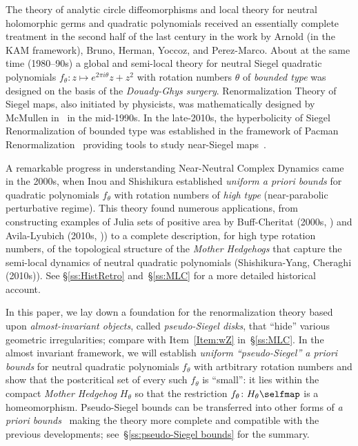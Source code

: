 \documentclass{amsart}
\newcommand{\1}{{\mathbb 1 }}
\theoremstyle{remark}
\numberwithin{equation}{section}
\theoremstyle{definition}
\begin{document}
The theory of analytic circle diffeomorphisms and local theory for neutral holomorphic germs
and quadratic polynomials received an essentially complete treatment in the
second half of the last century in the work by Arnold (in the KAM framework), Bruno,
Herman,  Yoccoz, and Perez-Marco. About at the same time (1980--90s) a global and semi-local theory for neutral Siegel quadratic polynomials $f_\theta: z\mapsto e^{2\pi i \theta} z + z^2$ with rotation numbers $\theta$  of {\em bounded type}  was designed on the basis of the  {\em Douady-Ghys surgery}. Renormalization Theory of Siegel maps, also initiated by physicists, was mathematically designed by McMullen in~\cite{McM1} in the mid-1990s. In the late-2010s, the hyperbolicity of Siegel Renormalization of bounded type was established in the framework of Pacman Renormalization~\cite{DLS} providing tools to study near-Siegel maps~\cite{DL}.


A remarkable progress in understanding Near-Neutral Complex Dynamics came in the 2000s, when Inou and Shishikura established  {\em uniform a priori bounds}
for quadratic polynomials $f_\theta$ with rotation numbers of {\em high type} (near-parabolic perturbative regime).  This theory found numerous applications, from constructing examples of Julia sets of positive area by Buff-Cheritat (2000s, \cite{BC}) and Avila-Lyubich (2010s, \cite{AL-posmeas})) to a complete
description, for high type rotation numbers,
of the topological structure of the  {\em Mother Hedgehogs} 
that capture the semi-local dynamics of  neutral quadratic polynomials
(Shishikura-Yang,  Cheraghi (2010s)). See \S\ref{ss:HistRetro} and~\S\ref{ss:MLC} for a more detailed historical account.



In this paper, we lay down a foundation for the renormalization  theory based upon \emph{almost-invariant objects}, called \emph{pseudo-Siegel disks}, that ``hide'' various geometric irregularities; compare with Item~\ref{Item:wZ} in~\S\ref{ss:MLC}. In the almost invariant framework, we will establish {\em uniform ``pseudo-Siegel'' a priori bounds} for neutral quadratic polynomials $f_\theta$ with artbitrary rotation numbers and show that the postcritical set of every such $f_\theta$ is ``small'': it lies within the compact {\em Mother Hedgehog} $H_\theta$ so that the restriction $f_\theta\colon H_\theta\selfmap $ is a homeomorphism. Pseudo-Siegel bounds can be transferred into other forms of \emph{a priori bounds}~\cite{DL:sector bounds, DL:psi bounds} making the theory more complete and compatible with the previous developments; see~\S\ref{ss:pseudo-Siegel bounds} for the summary. 
\end{document}
